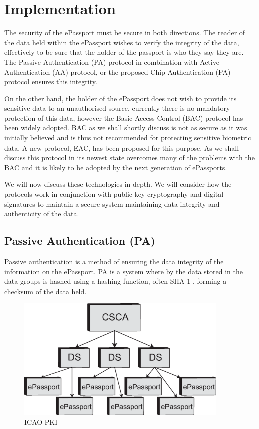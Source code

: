 \documentclass[12pt]{article}
\begin{document}
\section{Implementation}
{\color{red}{This section could cover practical issues related to the implementation of an algorithm, protocol, or system, and may link to demonstration software that has been developed as part of the project.}}

The security of the ePassport must be secure in both directions. The reader of the data held within the ePassport wishes to verify the integrity of the data, effectively to be sure that the holder of the passport is who they say they are. The Passive Authentication (PA) protocol in combination with Active Authentication (AA) protocol, or the proposed Chip Authentication (PA) protocol ensures this integrity.

On the other hand, the holder of the ePassport does not wish to provide its sensitive data to an unauthorised source, currently there is no mandatory protection of this data, however the Basic Access Control (BAC) protocol has been widely adopted. BAC as we shall shortly discuss is not as secure as it was initially believed and is thus not recommended for protecting sensitive biometric data. A new protocol, EAC, has been proposed for this purpose. As we shall discuss this protocol in its newest state overcomes many of the problems with the BAC and it is likely to be adopted by the next generation of ePassports.

We will now discuss these technologies in depth. We will consider how the protocols work in conjunction with public-key cryptography and digital signatures to maintain a secure system maintaining data integrity and authenticity of the data.  

\subsection{Passive Authentication (PA)}
\label{sec:PA}
Passive authentication is a method of ensuring the data integrity of the information on the ePassport. PA is a system where by the data stored in the data groups is hashed using a hashing function, often SHA-1 \cite{Avoine:2008wf}, forming a checksum of the data held. 

\begin{figure}
\centering
\includegraphics[width=4in]{IACO-PKI.eps}
\caption{ICAO-PKI}
\label{fig:ICAO-PKI}
\end{figure}
\end{document}
